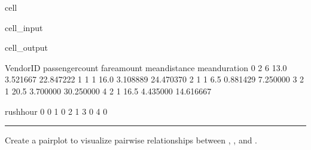 \documentclass[letterpaper,10pt,english]{sphinxmanual}
\begin{document}
\begin{sphinxuseclass}{cell}
\begin{sphinxuseclass}{cell_input}
\end{sphinxuseclass}
\begin{sphinxuseclass}{cell_output}
\begin{sphinxVerbatim}[commandchars=\\\{\}]
   VendorID  passenger\PYGZus{}count  fare\PYGZus{}amount  mean\PYGZus{}distance  mean\PYGZus{}duration  \PYGZbs{}
0         2                6         13.0       3.521667      22.847222   
1         1                1         16.0       3.108889      24.470370   
2         1                1          6.5       0.881429       7.250000   
3         2                1         20.5       3.700000      30.250000   
4         2                1         16.5       4.435000      14.616667   

   rush\PYGZus{}hour  
0          0  
1          0  
2          1  
3          0  
4          0  
\end{sphinxVerbatim}

\end{sphinxuseclass}
\end{sphinxuseclass}

\bigskip\hrule\bigskip


\sphinxAtStartPar
{}

\sphinxAtStartPar
Create a pairplot to visualize pairwise relationships between , , and .
\end{document}
